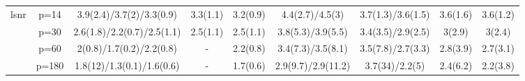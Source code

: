 \begin{table}[ht]
{\begin{tabular}{|c|c|ccccccc|}
  \midrule\multirow{4}[2]{*}{lsnr} & p=14 & 3.9(2.4)/3.7(2)/3.3(0.9) & 3.3(1.1) & 3.2(0.9) & 4.4(2.7)/4.5(3) & 3.7(1.3)/3.6(1.5) & 3.6(1.6) & 3.6(1.2) \\ 
   & p=30 & 2.6(1.8)/2.2(0.7)/2.5(1.1) & 2.5(1.1) & 2.5(1.1) & 3.8(5.3)/3.9(5.5) & 3.4(3.5)/2.9(2.5) & 3(2.9) & 3(2.4) \\ 
   & p=60 & 2(0.8)/1.7(0.2)/2.2(0.8) & - & 2.2(0.8) & 3.4(7.3)/3.5(8.1) & 3.5(7.8)/2.7(3.3) & 2.8(3.9) & 2.7(3.1) \\ 
   & p=180 & 1.8(12)/1.3(0.1)/1.6(0.6) & - & 1.7(0.6) & 2.9(9.7)/2.9(11.2) & 3.7(34)/2.2(5) & 2.4(6.2) & 2.2(3.8) \\ 
   \bottomrule 
\end{tabular}
}
\end{table}
